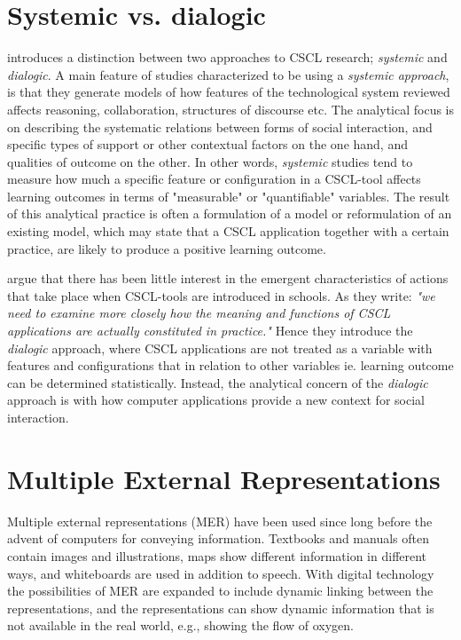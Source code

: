 \section{Systemic vs. dialogic}
\citet{arnseth2006approaching} introduces a distinction between two approaches to CSCL research; \emph{systemic} and \emph{dialogic}. A main feature of studies characterized to be using a \emph{systemic approach}, is that they generate models of how features of the technological system reviewed affects reasoning, collaboration, structures of discourse etc. The analytical focus is on describing the systematic relations between forms of social interaction, and specific types of support or other contextual factors on the one hand, and qualities of outcome on the other. \citep{arnseth2006approaching} In other words, \emph{systemic} studies tend to measure how much a specific feature or configuration in a CSCL-tool affects learning outcomes in terms of "measurable" or "quantifiable" variables. The result of this analytical practice is often a formulation of a model or reformulation of an existing model, which may state that a CSCL application together with a certain practice, are likely to produce a positive learning outcome.

\citeauthor*{arnseth2006approaching} argue that there has been little interest in the emergent characteristics of actions that take place when CSCL-tools are introduced in schools. As they write: \emph{"we need to examine more closely how the meaning and functions of CSCL applications are actually constituted in practice."} \citep[p. 181]{arnseth2006approaching} Hence they introduce the \emph{dialogic} approach, where CSCL applications are not treated as a variable with features and configurations that in relation to other variables ie. learning outcome can be determined statistically. Instead, the analytical concern  of the \emph{dialogic} approach is with how computer applications provide a new context for social interaction.

\section{Multiple External Representations}
Multiple external representations (MER) have been used since long before the advent of computers for conveying information. Textbooks and manuals often contain images and illustrations, maps show different information in different ways, and whiteboards are used in addition to speech. With digital technology the possibilities of MER are expanded to include dynamic linking between the representations, and the representations can show dynamic information that is not available in the real world, e.g., showing the flow of oxygen. 

